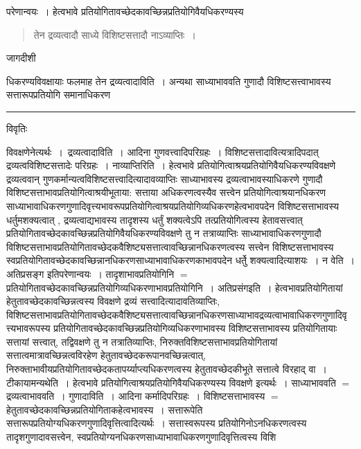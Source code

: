 \documentclass[10pt, openany]{book}
\begin{document}
{परेणान्वयः~। हेत्वभावे प्रतियोगितावच्छेदकावच्छिन्नप्रतियोगिवैयधिकरण्यस्य
\newpage
\begin{quote}
\vpc
तेन द्रव्यत्वादौ साध्ये विशिष्टसत्तादौ नाऽव्याप्तिः~।  
\end{quote}
\begin{center} जागदीशी \end{center}
{\la धिकरण्यविवक्षायाः फलमाह {\qt तेन द्रव्यत्वादाविति}~। अन्यथा साध्याभाववति गुणादौ विशिष्टसत्त्वाभावस्य सत्तारूपप्रतियोगि समानाधिकरण}\\
\hrule
\begin{center}     विवृतिः \end{center}
विवक्षणेनेत्यर्थः~।~{\la द्रव्यत्वादाविति~।} आदिना गुणवत्त्वादिपरिग्रहः~। विशिष्टसत्तादावित्यत्रादिपदात् द्रव्यत्वविशिष्टसत्तादेः परिग्रहः~। {\la नाव्याप्तिरिति~।} हेत्वभावे प्रतियोगित्वाश्रयप्रतियोगिवैयधिकरण्यविवक्षणे द्रव्यत्ववान् गुणकर्मान्यत्वविशिष्टसत्त्वादित्यादावव्याप्तिः साध्याभावस्य द्रव्यत्वाभावस्याधिकरणे गुणादौ विशिष्टसत्ताभावप्रतियोगित्वाश्रयीभूताया: सत्ताया अधिकरणत्वस्यैव सत्त्वेन प्रतियोगित्वाश्रयानधिकरण साध्याभावाधिकरणगुणादिवृत्त्यभावरूपप्रतियोगित्वाश्रयप्रतियोगिव्यधिकरणहेत्वभावपदेन विशिष्टसत्ताभावस्य धर्तुमशक्यत्वात् , द्रव्यत्वाद्यभावस्य तादृशस्य धर्तुं शक्यत्वेऽपि तत्प्रतियोगित्वस्य हेतावसत्त्वात् प्रतियोगितावच्छेदकावच्छिन्नप्रतियोगिवैयधिकरण्यविवक्षणे तु न तत्राव्याप्तिः साध्याभावाधिकरणगुणादौ
विशिष्टसत्ताभावप्रतियोगितावच्छेदकवैशिष्ट्यसत्तात्वावच्छिन्नानधिकरणत्वस्य सत्त्वेन  विशिष्टसत्ताभावस्य स्वप्रतियोगितावच्छेदकावच्छिन्नानधिकरणसाध्याभावाधिकरणकाभावपदेन धर्तेु  शक्यत्वादित्याशयः~। न वेति~। अतिप्रसङ्ग इतिपरेणान्वयः~। तादृशाभावप्रतियोगिनि $=$ प्रतियोगितावच्छेदकावच्छिन्नप्रतियोगिव्यधिकरणाभावप्रतियोगिनि~। अतिप्रसंगइति~। हेत्वभावप्रतियोगितायां हेतुतावच्छेदकावच्छिन्नत्वस्य विवक्षणे द्रव्यं सत्त्वादित्यादावतिव्याप्तिः, विशिष्टसत्ताभावप्रतियोगितावच्छेदकवैशिष्ट्यसत्तात्वावच्छिन्नानधिकरणसाध्याभावद्रव्यत्वाभावाधिकरणगुणादिवृत्त्यभावरूपस्य प्रतियोगितावच्छेदकावच्छिन्नप्रतियोगिव्यधिकरणाभावस्य विशिष्टसत्ताभावस्य प्रतियोगितायाः सत्तायां सत्त्वात्, तद्विवक्षणे तु न तत्रातिव्याप्तिः, निरुक्तविशिष्टसत्ताभावप्रतियोगितायां सत्तात्वमात्रावच्छिन्नत्वविरहेण हेतुतावच्छेदकरूपानवच्छिन्नत्वात्, निरुक्ताभावीयप्रतियोगितावच्छेदकतापर्य्याप्त्यधिकरणत्वस्य
हेतुतावच्छेदकीभूते सत्तात्वे विरहाद् वा~। टीकायामन्यथेति~। हेत्वभावे प्रतियोगित्वाश्रयप्रतियोगिवैयधिकरण्यस्य विवक्षणे इत्यर्थः~। साध्याभाववति $=$ द्रव्यत्वाभाववति~।
गुणादाविति~। आदिना कर्मादिपरिग्रहः~। विशिष्टसत्ताभावस्य $=$ हेतुतावच्छेदकावच्छिन्नप्रतियोगिताकहेत्वभावस्य~। सत्तारूपेति~ सत्तारूपप्रतियोग्यधिकरणगुणादिवृत्तित्वादित्यर्थः~। सत्तास्वरूपस्य प्रतियोगिनोऽनधिकरणत्वस्य तादृशगुणादावसत्त्वेन, स्वप्रतियोग्यनधिकरणसाध्याभावाधिकरणगुणादिवृत्तित्वस्य विशि 
}
\end{document}
